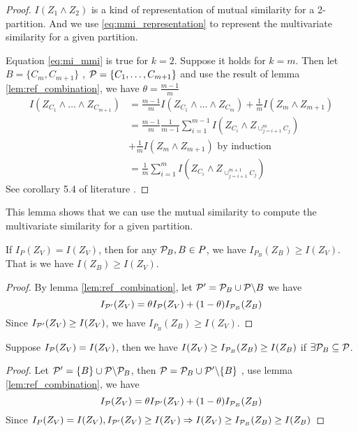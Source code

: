 \begin{proof}
\ifshowNonSelf
$I(Z_1 \wedge Z_2)$ is a kind of representation of mutual similarity for a 2-partition.
And we use \eqref{eq:mmi_representation} to represent the multivariate similarity for a given partition.

Equation \eqref{eq:mi_mmi} is true for $k=2$. Suppose it holds for $k=m$. Then
let $B=\{C_m, C_{m+1}\}$ , $\P=\{C_1, \dots, C_{m+1}\}$
and use the result of lemma \ref{lem:ref_combination}, 
we have $\theta = \frac{m-1}{m}$
\begin{align*}
I(Z_{C_1} \wedge \dots \wedge Z_{C_{m+1}}) & = 
 \frac{m-1}{m} I(Z_{C_1} \wedge \dots \wedge Z_{C_m})
+ \frac{1}{m}  I(Z_{m} \wedge Z_{m+1}) \\
& = \frac{m-1}{m} \frac{1}{m-1}\sum_{i=1}^{m-1} I(Z_{C_i} \wedge Z_{\cup_{j=i+1}^m C_j})\\
& + \frac{1}{m}  I(Z_{m} \wedge Z_{m+1})\textrm{ by induction} \\
& = \frac{1}{m} \sum_{i=1}^{m} I(Z_{C_i} \wedge Z_{\cup_{j=i+1}^{m+1} C_j})
\end{align*}
\else
See corollary 5.4 of literature \cite{ska}.
\fi
\end{proof}
\begin{remark}
This lemma shows that we can use the mutual similarity to compute the multivariate similarity for a given partition.
\end{remark}
\begin{lemma}\label{lem:elementLarge}
If $I_{P}(Z_V) = I(Z_V)$, then for any $\P_B, B\in P$, we have $I_{P_B}(Z_B) \geq I(Z_V)$. 
That is we have $I(Z_B) \geq I(Z_V)$.
\end{lemma}
\begin{proof}
By lemma \ref{lem:ref_combination}, let $\P' = \P_B \cup \P\backslash B$ we have 
\begin{equation}
I_{\P'}(Z_V) = \theta I_{\P}(Z_V) + (1-\theta) I_{\P_B}(Z_B)
\end{equation}
Since $I_{\P'}(Z_V)\geq I(Z_V)$, we have $I_{P_B}(Z_B) \geq I(Z_V)$.
\end{proof}
\begin{lemma}\label{lem:smallZB}
Suppose $I_{\P}(Z_V) = I(Z_V)$, then we have $I(Z_V) \geq I_{\P_B}(Z_B) \geq I(Z_B)$ if $\exists \P_B \subseteq \P$.
\end{lemma}
\begin{proof}
Let $\P' = \{B\} \cup \P\backslash \P_B$, then $\P = \P_B \cup \P'\backslash\{B\}$ , use lemma \ref{lem:ref_combination}, we have
\begin{equation}
I_{\P}(Z_V) = \theta I_{\P'}(Z_V) + (1-\theta) I_{\P_B}(Z_B)
\end{equation}
Since  $I_{P}(Z_V) = I(Z_V), I_{\P'}(Z_V)\geq I(Z_V) \Rightarrow I(Z_V) \geq I_{\P_B}(Z_B) \geq I(Z_B)$ 
\end{proof}
